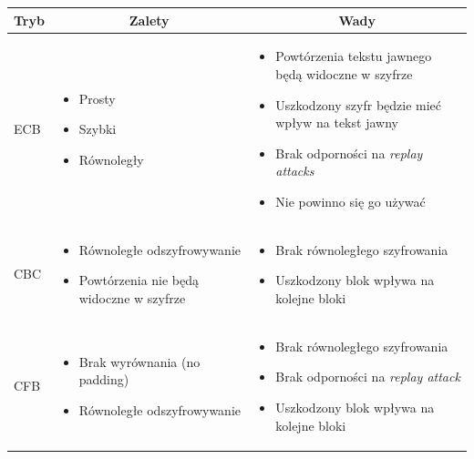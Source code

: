 \documentclass[a4paper,11pt]{article}
\theoremstyle{mytheor}
\begin{document}
\begin{table}[]
    \begin{tabular}{|p{}|p{}|p{}|}
        \hline
        \multicolumn{1}{|c}{\textbf{Tryb}} & \multicolumn{1}{|c|}{\textbf{Zalety}} & \multicolumn{1}{|c|}{\textbf{Wady}}
        \\ \hline
        ECB & \begin{itemize}
            \setlength\itemsep{-0.5em}
            \item Prosty
            \item Szybki
            \item Równoległy
        \end{itemize} & \begin{itemize}
            \setlength\itemsep{-0.8em}
            \item Powtórzenia tekstu jawnego będą widoczne w szyfrze
            \item Uszkodzony szyfr będzie mieć wpływ na tekst jawny
            \item Brak odporności na \textit{replay attacks}
            \item Nie powinno się go używać
        \end{itemize}
        \\ \hline

        CBC & \begin{itemize}
            \setlength\itemsep{-0.5em}
            \item Równoległe odszyfrowywanie
            \item Powtórzenia nie będą widoczne w szyfrze
        \end{itemize} & \begin{itemize}
            \setlength\itemsep{-0.8em}
            \item Brak równoległego szyfrowania
            \item Uszkodzony blok wpływa na kolejne bloki
        \end{itemize}
        \\ \hline

        CFB & \begin{itemize}
            \setlength\itemsep{-0.5em}
            \item Brak wyrównania (no padding)
            \item Równoległe odszyfrowywanie
        \end{itemize} & \begin{itemize}
            \setlength\itemsep{-0.8em}
            \item Brak równoległego szyfrowania
            \item Brak odporności na \textit{replay attack}
            \item Uszkodzony blok wpływa na kolejne bloki
        \end{itemize}
        \\ \hline


\end{tabular}
\end{table}
\end{document}

